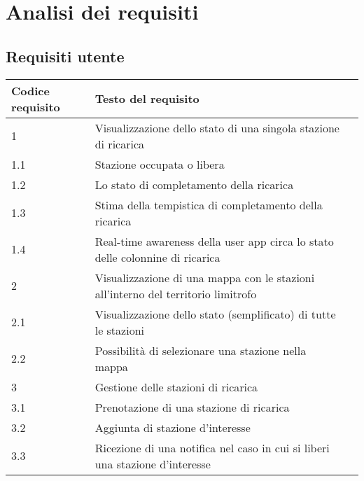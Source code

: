 
\section{Analisi dei requisiti}

\subsection*{Requisiti utente}

\begin{tabular}{l|ll}
    Codice requisito & Testo del requisito                                                               \\
    \hline
    1                & Visualizzazione dello stato di una singola stazione di ricarica                   \\
    1.1              & Stazione occupata o libera                                                        \\
    1.2              & Lo stato di completamento della ricarica                                          \\
    1.3              & Stima della tempistica di completamento della ricarica                            \\
    1.4              & Real-time awareness della user app circa lo stato delle colonnine di ricarica     \\
    2                & Visualizzazione di una mappa con le stazioni all'interno del territorio limitrofo \\
    2.1              & Visualizzazione dello stato (semplificato) di tutte le stazioni                   \\
    2.2              & Possibilità di selezionare una stazione nella mappa                               \\
    3                & Gestione delle stazioni di ricarica                                               \\
    3.1              & Prenotazione di una stazione di ricarica                                          \\
    3.2              & Aggiunta di stazione d'interesse                                                  \\
    3.3              & Ricezione di una notifica nel caso in cui si liberi una stazione d'interesse      \\

\end{tabular}
